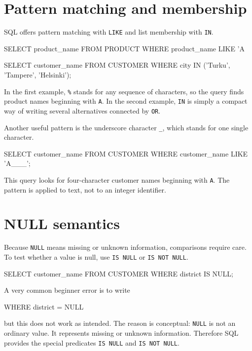 \documentclass[11pt,a4paper,openany]{book}
\begin{document}
\section{Pattern matching and membership}
SQL offers pattern matching with \texttt{LIKE} and list membership with \texttt{IN}.

\begin{codesql}
SELECT product_name
FROM PRODUCT
WHERE product_name LIKE 'A%
\end{codesql}

\begin{codesql}
SELECT customer_name
FROM CUSTOMER
WHERE city IN ('Turku', 'Tampere', 'Helsinki');
\end{codesql}

In the first example, \texttt{\%} stands for any sequence of characters, so the query finds product names beginning with \texttt{A}. In the second example, \texttt{IN} is simply a compact way of writing several alternatives connected by \texttt{OR}.

Another useful pattern is the underscore character \texttt{\_}, which stands for one single character.

\begin{codesql}
SELECT customer_name
FROM CUSTOMER
WHERE customer_name LIKE 'A___';
\end{codesql}

This query looks for four-character customer names beginning with \texttt{A}. The pattern is applied to text, not to an integer identifier.

\section{NULL semantics}
Because \texttt{NULL} means missing or unknown information, comparisons require care. To test whether a value is null, use \texttt{IS NULL} or \texttt{IS NOT NULL}.

\begin{codesql}
SELECT customer_name
FROM CUSTOMER
WHERE district IS NULL;
\end{codesql}

A very common beginner error is to write
\begin{codesql}
WHERE district = NULL
\end{codesql}
but this does not work as intended. The reason is conceptual: \texttt{NULL} is not an ordinary value. It represents missing or unknown information. Therefore SQL provides the special predicates \texttt{IS NULL} and \texttt{IS NOT NULL}.
\end{document}
